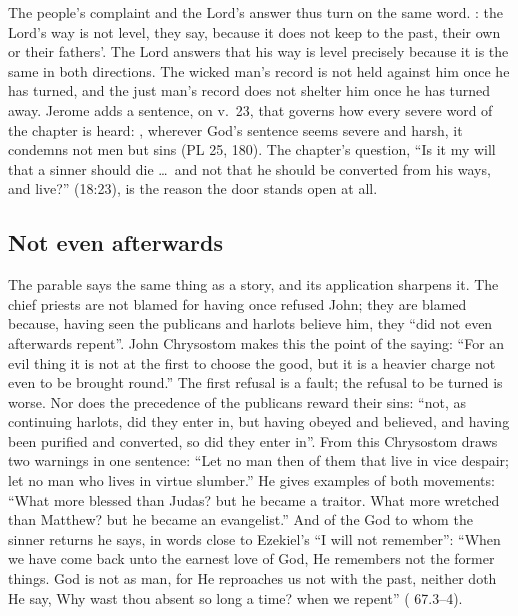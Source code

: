 The people's complaint and the Lord's answer thus turn on the same word.
: the Lord's way is not level, they say,
because it does not keep to the past, their own or their fathers'. The Lord
answers that his way is level precisely because it is the same in both
directions. The wicked man's record is not held against him once he has
turned, and the just man's record does not shelter him once he has turned
away. Jerome adds a sentence, on v.~23, that governs how every severe word of
the chapter is heard: , wherever God's sentence seems
severe and harsh, it condemns not men but sins (PL 25, 180). The chapter's
question, ``Is it my will that a sinner should die \ldots\ and not that he
should be converted from his ways, and live?'' (18:23), is the reason the door
stands open at all.

\subsection{Not even afterwards}

The parable says the same thing as a story, and its application sharpens it.
The chief priests are not blamed for having once refused John; they are blamed
because, having seen the publicans and harlots believe him, they ``did not even
afterwards repent''. John Chrysostom makes this the point of the saying: ``For
an evil thing it is not at the first to choose the good, but it is a heavier
charge not even to be brought round.'' The first refusal is a fault; the
refusal to be turned is worse. Nor does the precedence of the publicans reward
their sins: ``not, as continuing harlots, did they enter in, but having obeyed
and believed, and having been purified and converted, so did they enter in''.
From this Chrysostom draws two warnings in one sentence: ``Let no man then of
them that live in vice despair; let no man who lives in virtue slumber.'' He
gives examples of both movements: ``What more blessed than Judas? but he became
a traitor. What more wretched than Matthew? but he became an evangelist.'' And of
the God to whom the sinner returns he says, in words close to Ezekiel's ``I
will not remember'': ``When we have come back unto the earnest love of God, He remembers not the
former things. God is not as man, for He reproaches us not with the past,
neither doth He say, Why wast thou absent so long a time? when we repent''
( 67.3--4).

